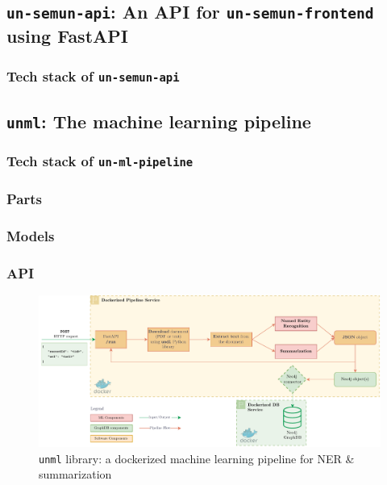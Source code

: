 \documentclass[11pt]{article}
\begin{document}
\subsection{\texttt{un-semun-api}: An API for \texttt{un-semun-frontend} using FastAPI} \label{ssec:un-semun-api-an-api-for-un-semun-frontend-using-fastapi}
\subsubsection*{Tech stack of \texttt{un-semun-api}} \label{sssec:tech-stack-of-un-semun-api}



\subsection{\texttt{unml}: The machine learning pipeline} \label{ssec:unml-the-machine-learning-pipeline}

\subsubsection*{Tech stack of \texttt{un-ml-pipeline}} \label{sssec:tech-stack-of-un-ml-pipeline}

\subsubsection{Parts} \label{sssec:parts}


\subsubsection{Models} \label{sssec:models}

\subsubsection{API} \label{sssec:api}


\begin{figure}[!htb]
    \centering

    \includegraphics[width=\textwidth]{res/ml-pipeline.pdf}
    \caption{\texttt{unml} library: a dockerized machine learning pipeline for NER \& summarization}

    \label{fig:ml-pipeline}
\end{figure}
\end{document}
